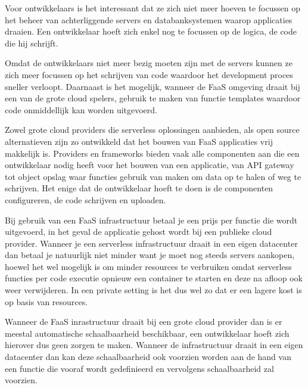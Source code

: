 \begin{description}[style=unboxed, labelwidth=\linewidth, listparindent =0pt]
    \item[Geen beheer van infrastructuur]
    Voor ontwikkelaars is het interessant dat ze zich niet meer hoeven te focussen op het beheer van achterliggende servers en databanksystemen waarop applicaties draaien. Een ontwikkelaar hoeft zich enkel nog te focussen op de logica, de code die hij schrijft.
    \newline
    
    \item [Snellere development en deployment]
    Omdat de ontwikkelaars niet meer bezig moeten zijn met de servers kunnen ze zich meer focussen op het schrijven van code waardoor het development proces sneller verloopt. Daarnaast is het mogelijk, wanneer de FaaS omgeving draait bij een van de grote cloud spelers, gebruik te maken van functie templates waardoor code onmiddellijk kan worden uitgevoerd.
    
    \item [Makkelijk in gebruik]
    Zowel grote cloud providers die serverless oplossingen aanbieden, als open source alternatieven zijn zo ontwikkeld dat het bouwen van FaaS applicaties vrij makkelijk is. Providers en frameworks bieden vaak alle componenten aan die een ontwikkelaar nodig heeft voor het bouwen van een applicatie, van API gateway tot object opslag waar functies gebruik van maken om data op te halen of weg te schrijven. Het enige dat de ontwikkelaar hoeft te doen is de componenten configureren, de code schrijven en uploaden.
    \newline
    
    \item [Lagere kosten]
    Bij gebruik van een FaaS infrastructuur betaal je een prijs per functie die wordt uitgevoerd, in het geval de applicatie gehost wordt bij een publieke cloud provider. Wanneer je een serverless infrastructuur draait in een eigen datacenter dan betaal je natuurlijk niet minder want je moet nog steeds servers aankopen, hoewel het wel mogelijk is om minder resources te verbruiken omdat serverless functies per code executie opnieuw een container te starten en deze na afloop ook weer verwijderen. In een private setting is het dus wel zo dat er een lagere kost is op basis van resources.
    \newline
    
     \item [Verbeterde schaalbaarheid]
     Wanneer de FaaS inrastructuur draait bij een grote cloud provider dan is er meestal automatische schaalbaarheid beschikbaar, een ontwikkelaar hoeft zich hierover dus geen zorgen te maken. Wanneer de infrastructuur draait in een eigen datacenter dan kan deze schaalbaarheid ook voorzien worden aan de hand van een functie die vooraf wordt gedefinieerd en vervolgens schaalbaarheid zal voorzien.
     \newline 
\end{description}

